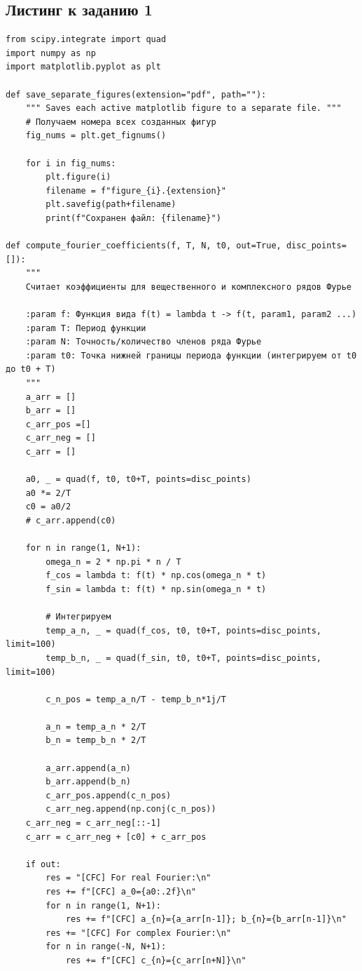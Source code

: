 \documentclass[a4paper, 12pt]{article}
\begin{document}
\subsection{Листинг к заданию 1}
\begin{verbatim}
from scipy.integrate import quad
import numpy as np
import matplotlib.pyplot as plt

def save_separate_figures(extension="pdf", path=""):
    """ Saves each active matplotlib figure to a separate file. """
    # Получаем номера всех созданных фигур
    fig_nums = plt.get_fignums()

    for i in fig_nums:
        plt.figure(i)
        filename = f"figure_{i}.{extension}"
        plt.savefig(path+filename)
        print(f"Сохранен файл: {filename}")

def compute_fourier_coefficients(f, T, N, t0, out=True, disc_points=[]):
    """
    Считает коэффициенты для вещественного и комплексного рядов Фурье
    
    :param f: Функция вида f(t) = lambda t -> f(t, param1, param2 ...)
    :param T: Период функции
    :param N: Точность/количество членов ряда Фурье
    :param t0: Точка нижней границы периода функции (интегрируем от t0 до t0 + T)
    """
    a_arr = []
    b_arr = []
    c_arr_pos =[]
    c_arr_neg = []
    c_arr = []

    a0, _ = quad(f, t0, t0+T, points=disc_points)
    a0 *= 2/T
    c0 = a0/2
    # c_arr.append(c0)
    
    for n in range(1, N+1):
        omega_n = 2 * np.pi * n / T
        f_cos = lambda t: f(t) * np.cos(omega_n * t)
        f_sin = lambda t: f(t) * np.sin(omega_n * t)

        # Интегрируем
        temp_a_n, _ = quad(f_cos, t0, t0+T, points=disc_points, limit=100)
        temp_b_n, _ = quad(f_sin, t0, t0+T, points=disc_points, limit=100)

        c_n_pos = temp_a_n/T - temp_b_n*1j/T

        a_n = temp_a_n * 2/T
        b_n = temp_b_n * 2/T

        a_arr.append(a_n)
        b_arr.append(b_n)
        c_arr_pos.append(c_n_pos)
        c_arr_neg.append(np.conj(c_n_pos))
    c_arr_neg = c_arr_neg[::-1]
    c_arr = c_arr_neg + [c0] + c_arr_pos

    if out: 
        res = "[CFC] For real Fourier:\n"
        res += f"[CFC] a_0={a0:.2f}\n"
        for n in range(1, N+1):
            res += f"[CFC] a_{n}={a_arr[n-1]}; b_{n}={b_arr[n-1]}\n"
        res += "[CFC] For complex Fourier:\n"
        for n in range(-N, N+1):
            res += f"[CFC] c_{n}={c_arr[n+N]}\n"


\end{verbatim}
\end{document}
